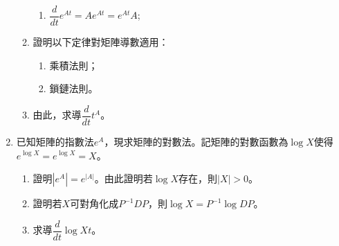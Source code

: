 \documentclass[12pt]{article}
\begin{document}
\begin{enumerate}
\begin{enumerate}
\begin{enumerate}
                \item $\dfrac{d}{dt}e^{At}=Ae^{At}=e^{At}A$;
            \end{enumerate}
            \item 證明以下定律對矩陣導數適用：\begin{enumerate}
                \item 乘積法則；
                \item 鎖鏈法則。
            \end{enumerate}
            \item 由此，求導$\dfrac{d}{dt}t^{A}$。
        \end{enumerate}
        \item 已知矩陣的指數法$e^{A}$，現求矩陣的對數法。記矩陣的對數函數為$\log{X}$使得$e^{\log{X}}=e^{\log{X}}=X$。\begin{enumerate}
            \item 證明$|e^A|=e^{|A|}$。由此證明若$\log{X}$存在，則$|X|> 0$。
            \item 證明若$X$可對角化成$P^{-1}DP$，則$\log{X}=P^{-1}\log{D}P$。
            \item 求導$\dfrac{d}{dt}\log{Xt}$。
        \end{enumerate}
    \end{enumerate}
\end{document}
